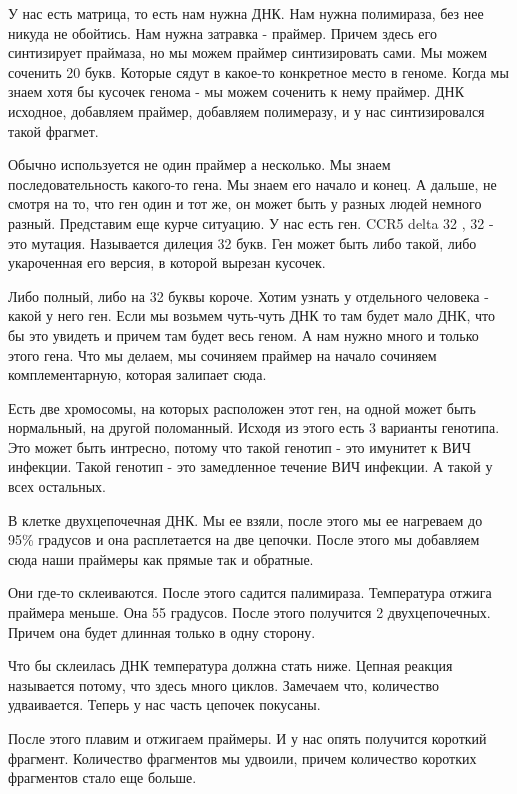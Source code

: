 \begin{description}
У нас есть матрица, то есть нам нужна ДНК. Нам нужна полимираза,
без нее никуда не обойтись. Нам нужна затравка - праймер. Причем здесь
его синтизирует праймаза, но мы можем праймер синтизировать сами.
Мы можем соченить 20 букв. Которые сядут в какое-то конкретное место в
геноме. Когда мы знаем хотя бы кусочек генома - мы можем
соченить к нему праймер. ДНК исходное, добавляем праймер,
добавляем полимеразу, и у нас синтизировался такой фрагмет. 

Обычно используется не один праймер а несколько. Мы знаем последовательность 
какого-то гена. Мы знаем его начало и конец. А дальше, не смотря на то, что ген один и тот же, 
он может быть у разных людей немного разный. Представим еще курче ситуацию. У нас есть ген. 
CCR5 delta 32 , 32 - это мутация. Называется дилеция 32 букв. Ген может быть либо такой, 
либо укароченная его версия, в которой вырезан кусочек. 

Либо полный, либо на 32 буквы короче. Хотим узнать у отдельного человека - какой у него ген. 
Если мы возьмем чуть-чуть ДНК то там будет мало ДНК, что бы это увидеть и причем там будет весь геном. 
А нам нужно много и только этого гена. 
Что мы делаем, мы сочиняем праймер на начало сочиняем комплементарную, которая залипает сюда. 

Есть две хромосомы, на которых расположен этот ген, на одной может быть нормальный, на другой 
поломанный. Исходя из этого есть 3 варианты генотипа. Это может быть интресно, потому что 
такой генотип - это имунитет к ВИЧ инфекции. Такой генотип - это замедленное течение 
ВИЧ инфекции. А такой у всех остальных. 
                                             
В клетке двухцепочечная ДНК. Мы ее взяли, после этого 
мы ее нагреваем до 95\% градусов и она расплетается на две цепочки. 
После этого мы добавляем сюда наши праймеры как прямые так и обратные. 

Они где-то склеиваются. После этого садится палимираза. Температура отжига 
праймера меньше. Она 55 градусов. После этого получится 2 двухцепочечных. 
Причем она будет длинная только в одну сторону. 

Что бы склеилась ДНК температура должна стать ниже. 
Цепная реакция называется потому, что здесь много циклов. Замечаем что, 
количество удваивается. Теперь 
у нас часть цепочек покусаны. 

После этого плавим и отжигаем праймеры. 
И у нас опять получится короткий фрагмент. Количество 
фрагментов мы удвоили, причем количество коротких
фрагментов стало еще больше. 


\end{description}
